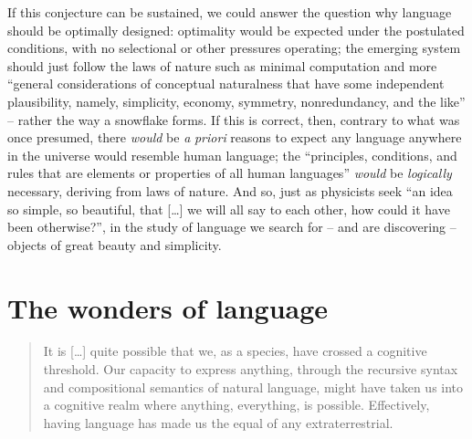 \documentclass[output=paper]{langsci/langscibook}
\begin{document}
If this conjecture can be sustained, we could answer the question why language
should be optimally designed: optimality would be expected under the postulated
conditions, with no selectional or other pressures operating; the emerging
system should just follow the laws of nature such as minimal computation and
more “general considerations of conceptual naturalness that have some
independent plausibility, namely, simplicity, economy, symmetry, nonredundancy,
and the like” – rather the way a snowflake forms. If this is correct, then,
contrary to what was once presumed, there \emph{would} be \emph{a}
\emph{priori} reasons to expect any language anywhere in the universe would
resemble human language; the “principles, conditions, and rules that are
elements or properties of all human languages” \emph{would} be \emph{logically}
necessary, deriving from laws of nature. And so, just as physicists seek “an
idea so simple, so beautiful, that […] we will all say to each other, how could
it have been otherwise?”, in the study of language we search for – and are
discovering – objects of great beauty and simplicity.

\section{The wonders of language}

\begin{quote}

It is […] quite possible that we, as a species, have crossed a cognitive
thre\-shold. Our capacity to express anything, through the recursive syntax and
compositional semantics of natural language, might have taken us into a
cognitive realm where anything, everything, is possible. Effectively, having
language has made us the equal of any extraterrestrial.
\parencite[181--182]{Roberts2017}

\end{quote}
\end{document}

